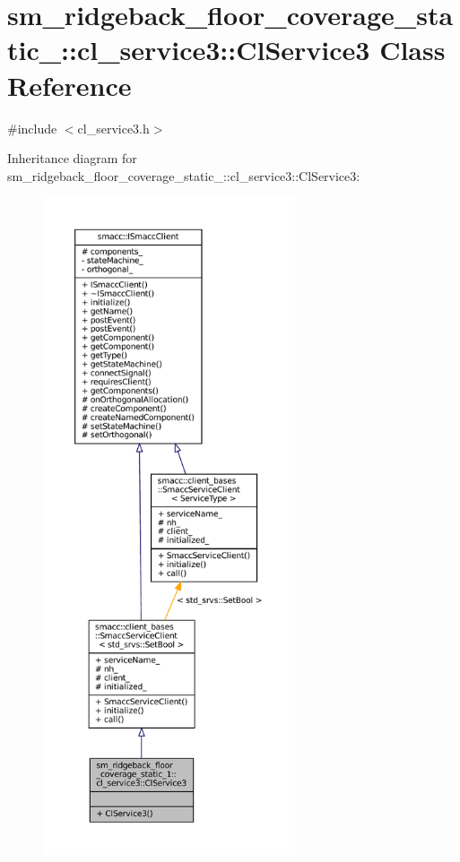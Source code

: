 \hypertarget{classsm__ridgeback__floor__coverage__static__1_1_1cl__service3_1_1ClService3}{}\section{sm\+\_\+ridgeback\+\_\+floor\+\_\+coverage\+\_\+static\+\_\+:\+:cl\+\_\+service3\+:\+:Cl\+Service3 Class Reference}
\label{classsm__ridgeback__floor__coverage__static__1_1_1cl__service3_1_1ClService3}


{\ttfamily \#include $<$cl\+\_\+service3.\+h$>$}



Inheritance diagram for sm\+\_\+ridgeback\+\_\+floor\+\_\+coverage\+\_\+static\+\_\+:\+:cl\+\_\+service3\+:\+:Cl\+Service3\+:
\nopagebreak
\begin{figure}[H]
\begin{center}
\leavevmode
\includegraphics[height=550pt]{classsm__ridgeback__floor__coverage__static__1_1_1cl__service3_1_1ClService3__inherit__graph}
\end{center}
\end{figure}


